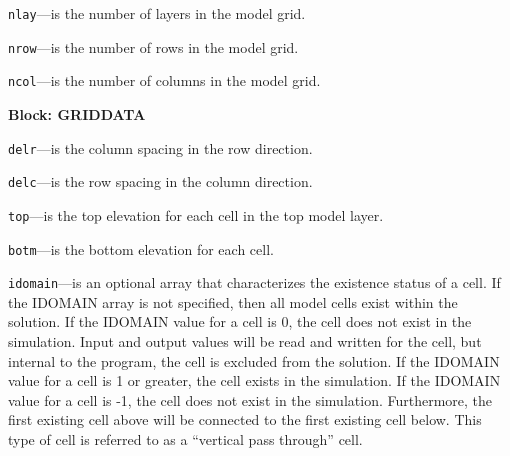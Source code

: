 \begin{description}
\item \texttt{nlay}---is the number of layers in the model grid.

\item \texttt{nrow}---is the number of rows in the model grid.

\item \texttt{ncol}---is the number of columns in the model grid.

\end{description}
\item \textbf{Block: GRIDDATA}

\begin{description}
\item \texttt{delr}---is the column spacing in the row direction.

\item \texttt{delc}---is the row spacing in the column direction.

\item \texttt{top}---is the top elevation for each cell in the top model layer.

\item \texttt{botm}---is the bottom elevation for each cell.

\item \texttt{idomain}---is an optional array that characterizes the existence status of a cell.  If the IDOMAIN array is not specified, then all model cells exist within the solution.  If the IDOMAIN value for a cell is 0, the cell does not exist in the simulation.  Input and output values will be read and written for the cell, but internal to the program, the cell is excluded from the solution.  If the IDOMAIN value for a cell is 1 or greater, the cell exists in the simulation.  If the IDOMAIN value for a cell is -1, the cell does not exist in the simulation.  Furthermore, the first existing cell above will be connected to the first existing cell below.  This type of cell is referred to as a ``vertical pass through'' cell.

\end{description}

